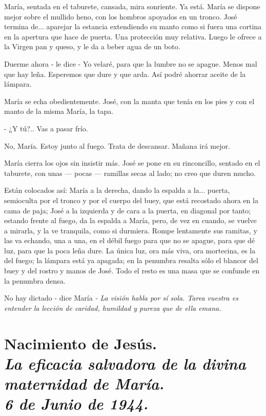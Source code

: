 \documentclass[12pt]{book} %
\begin{document}
María, sentada en el taburete, cansada, mira sonriente. Ya está. María se dispone mejor sobre el mullido heno, con los hombros apoyados en un tronco. José termina de... aparejar la estancia extendiendo su manto como si fuera una cortina en la apertura que hace de puerta. Una protección muy relativa. Luego le ofrece a la Virgen pan y queso, y le da a beber agua de un boto. 

Duerme ahora - le dice - Yo velaré, para que la lumbre no se apague. Menos mal que hay leña. Esperemos que dure y que arda. Así podré ahorrar aceite de la lámpara. 

María se echa obedientemente. José, con la manta que tenía en los pies y con el manto de la misma María, la tapa. 

- ¿Y tú?.. Vas a pasar frío. 

No, María. Estoy junto al fuego. Trata de descansar. Mañana irá mejor. 

María cierra los ojos sin insistir más. José se pone en su rinconcillo, sentado en el taburete, con unas — pocas — ramillas secas al lado; no creo que duren mucho. 

Están colocados así: María a la derecha, dando la espalda a la... puerta, semioculta por el tronco y por el cuerpo del buey, que está recostado ahora en la cama de paja; José a la izquierda y de cara a la puerta, en diagonal por tanto; estando frente al fuego, da la espalda a María, pero, de vez en cuando, se vuelve a mirarla, y la ve tranquila, como si durmiera. Rompe lentamente sus ramitas, y las va echando, una a una, en el débil fuego para que no se apague, para que dé luz, para que la poca leña dure. La única luz, ora más viva, ora mortecina, es la del fuego; la lámpara está ya apagada; en la penumbra resalta sólo el blancor del buey y del rostro y manos de José. Todo el resto es una masa que se confunde en la penumbra densa. 

No hay dictado - dice María \emph{- La visión habla por sí sola. Tarea vuestra es entender la lección de caridad, humildad y pureza que de ella emana. }

\chapter*{Nacimiento de Jesús. \\ \normalfont\normalsize\textit{La eficacia salvadora de la divina maternidad de María. \\ 6 de Junio de 1944.}}
\end{document}
